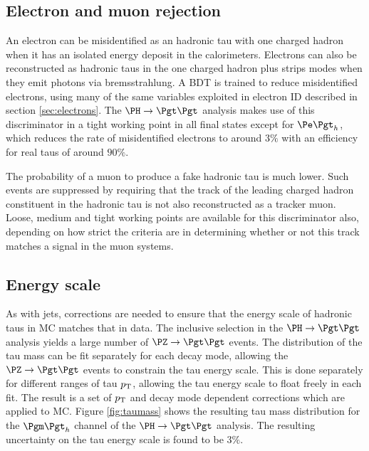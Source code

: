 \subsection{Electron and muon rejection}
\label{sec:tauleptonrejection}

An electron can be misidentified as an hadronic tau with one charged hadron when
it has an isolated energy deposit in the calorimeters. Electrons can also be
reconstructed as hadronic taus in the one charged hadron plus strips modes when 
they emit photons via bremsstrahlung. A \ac{BDT} is trained to reduce
misidentified electrons, using many of the same variables exploited in electron
ID described in section \ref{sec:electrons}. The $\PH\to\Pgt\Pgt$ analysis makes 
use of this discriminator in a tight working point in all final states except
for $\etau$, which reduces the rate 
of misidentified electrons to around $3\%$ with an efficiency for real taus of
around $90\%$. 

The probability of a muon to produce a fake hadronic tau is much lower. Such
events are suppressed by requiring that the track of the leading charged hadron
constituent in the hadronic tau is not also reconstructed as a tracker muon.
Loose, medium and tight working points are available for this discriminator
also, depending on how strict the criteria are in determining whether or not
this track matches a signal in the muon systems. 

\subsection{Energy scale}
\label{sec:taues}

As with jets, corrections are needed to ensure that the energy scale
of hadronic taus in \ac{MC} matches that in data. The inclusive selection in the
$\PH \to \Pgt\Pgt$ analysis yields a large number of $\ZToTauTau$ events. The
distribution of the tau mass can be fit separately for each decay mode, allowing
the $\ZToTauTau$ events to constrain the tau energy scale. This is done
separately for different ranges of tau $p_{\mathrm{T}}$, allowing the tau energy scale to
float freely in each fit. The result is a set of $p_{\mathrm{T}}$ and decay mode dependent
corrections which are applied to \ac{MC}. Figure \ref{fig:taumass} shows the
resulting tau mass distribution for the $\mutau$ channel of the $\PH\to\Pgt\Pgt$
analysis. The resulting uncertainty on the tau energy scale is found to be $3\%$.

